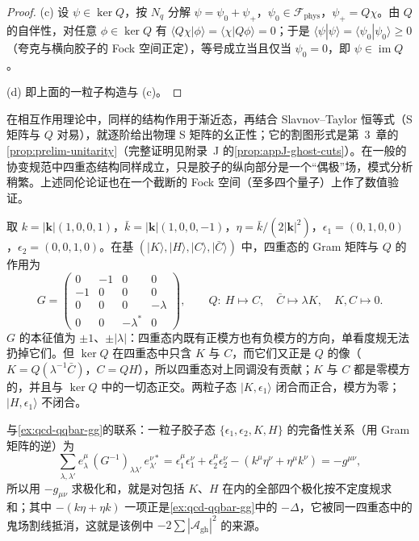 \begin{proof}
(c) 设 $\psi\in\ker Q$，按 $N_q$ 分解 $\psi=\psi_0+\psi_+$，$\psi_0\in\mathcal F_{\mathrm{phys}}$，$\psi_+=Q\chi$。由 $Q$ 的自伴性，对任意 $\phi\in\ker Q$ 有 $\langle Q\chi|\phi\rangle=\langle\chi|Q\phi\rangle=0$；于是 $\langle\psi|\psi\rangle=\langle\psi_0|\psi_0\rangle\ge0$（夸克与横向胶子的 Fock 空间正定），等号成立当且仅当 $\psi_0=0$，即 $\psi\in\operatorname{im}Q$。

(d) 即上面的一粒子构造与 (c)。
\end{proof}

在相互作用理论中，同样的结构作用于渐近态，再结合 Slavnov--Taylor 恒等式（S 矩阵与 $Q$ 对易），就逐阶给出物理 S 矩阵的幺正性\cite{KugoOjima1979}；它的割图形式是第~3~章的\cref{prop:prelim-unitarity}（完整证明见附录~J 的\cref{prop:appJ-ghost-cuts}）。在一般的协变规范中四重态结构同样成立，只是胶子的纵向部分是一个“偶极”场，模式分析稍繁\cite{KugoOjima1979}。上述同伦论证也在一个截断的 Fock 空间（至多四个量子）上作了数值验证。%

\begin{example}[单一动量模式的四重态]\label{ex:qcd-brst-quartet}
取 $k=|\mathbf k|(1,0,0,1)$，$\bar k=|\mathbf k|(1,0,0,-1)$，$\eta=\bar k/(2|\mathbf k|^2)$，$\epsilon_1=(0,1,0,0)$，$\epsilon_2=(0,0,1,0)$。在基 $(|K\rangle,|H\rangle,|C\rangle,|\bar C\rangle)$ 中，四重态的 Gram 矩阵与 $Q$ 的作用为
\[
G=\begin{pmatrix}0&-1&0&0\\-1&0&0&0\\0&0&0&-\lambda\\0&0&-\lambda^*&0\end{pmatrix},\qquad
Q:\ H\mapsto C,\quad \bar C\mapsto\lambda K,\quad K,C\mapsto0 .
\]
$G$ 的本征值为 $\pm1$、$\pm|\lambda|$：四重态内既有正模方也有负模方的方向，单看度规无法扔掉它们。但 $\ker Q$ 在四重态中只含 $K$ 与 $C$，而它们又正是 $Q$ 的像（$K=Q(\lambda^{-1}\bar C)$，$C=QH$），所以四重态对上同调没有贡献；$K$ 与 $C$ 都是零模方的，并且与 $\ker Q$ 中的一切态正交。两粒子态 $|K,\epsilon_1\rangle$ 闭合而正合，模方为零；$|H,\epsilon_1\rangle$ 不闭合。

与\cref{ex:qcd-qqbar-gg}的联系：一粒子胶子态 $\{\epsilon_1,\epsilon_2,K,H\}$ 的完备性关系（用 Gram 矩阵的逆）为
\[
\sum_{\lambda,\lambda'}e^\mu_\lambda\,(G^{-1})_{\lambda\lambda'}\,e^{\nu*}_{\lambda'}=\epsilon_1^\mu\epsilon_1^\nu+\epsilon_2^\mu\epsilon_2^\nu-(k^\mu\eta^\nu+\eta^\mu k^\nu)=-g^{\mu\nu},
\]
所以用 $-g_{\mu\nu}$ 求极化和，就是对包括 $K$、$H$ 在内的全部四个极化按不定度规求和；其中 $-(k\eta+\eta k)$ 一项正是\cref{ex:qcd-qqbar-gg}中的 $-\Delta$，它被同一四重态中的鬼场割线抵消，这就是该例中 $-2\sum|\mathcal A_{\mathrm{gh}}|^2$ 的来源。
\end{example}

